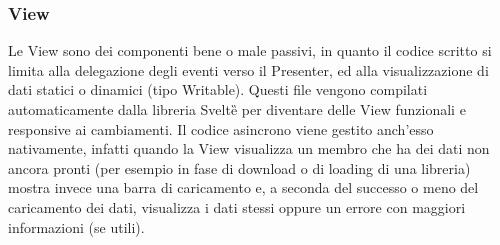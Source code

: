     \subsubsection{View}
        Le View sono dei componenti bene o male passivi, in quanto il codice scritto si limita alla delegazione degli eventi verso il Presenter, ed alla visualizzazione di dati statici o dinamici (tipo Writable). 
        Questi file vengono compilati automaticamente dalla libreria Svelte\G{} per diventare delle View funzionali e responsive ai cambiamenti.
        Il codice asincrono viene gestito anch'esso nativamente, infatti quando la View visualizza un membro che ha dei dati non ancora pronti (per esempio in fase di download o di loading di una libreria) mostra invece una barra di caricamento e,
        a seconda del successo o meno del caricamento dei dati, visualizza i dati stessi oppure un errore con maggiori informazioni (se utili).

